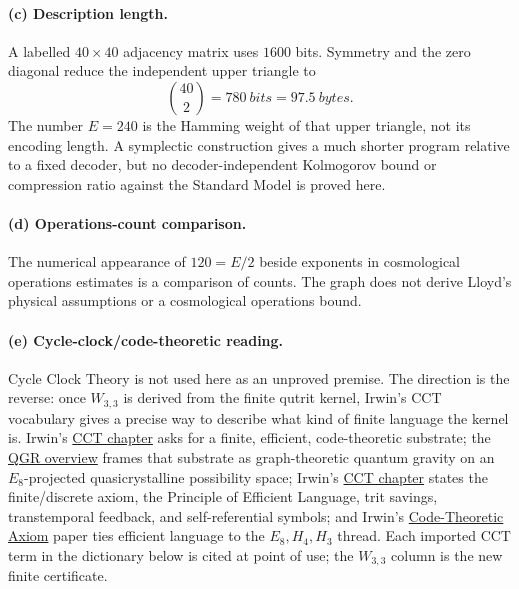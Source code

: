 \documentclass[12pt,a4paper]{article}
\def\text#1{#1}%
\theoremstyle{definition}
\begin{document}
\paragraph{(c) Description length.}
A labelled $40\times40$ adjacency matrix uses $1600$ bits.  Symmetry and
the zero diagonal reduce the independent upper triangle to
\[
 \binom{40}{2}=780\ \text{bits}=97.5\ \text{bytes}.
\]
The number $E=240$ is the Hamming weight of that upper triangle, not
its encoding length.  A symplectic construction gives a much shorter
program relative to a fixed decoder, but no decoder-independent
Kolmogorov bound or compression ratio against the Standard Model is
proved here.

\paragraph{(d) Operations-count comparison.}
The numerical appearance of $120=E/2$ beside exponents in cosmological
operations estimates is a comparison of counts.  The graph does not
derive Lloyd's physical assumptions or a cosmological operations bound.

\paragraph{(e) Cycle-clock/code-theoretic reading.}
Cycle Clock Theory is not used here as an unproved premise.  The
direction is the reverse: once $W_{3,3}$ is derived from the finite
qutrit kernel, Irwin's CCT vocabulary gives a precise way to describe
what kind of finite language the kernel is.  Irwin's
\href{https://www.altpropulsion.com/wp-content/uploads/2025/01/Klee-Irwin-Clock-Cycle-Theory-Jan2025.pdf}{CCT chapter}
asks for a finite, efficient, code-theoretic substrate; the
\href{https://quantumgravityresearch.org/cycle-clock-theory-overview/}{QGR overview}
frames that substrate as graph-theoretic quantum gravity on an
$E_8$-projected quasicrystalline possibility space; Irwin's
\href{https://www.altpropulsion.com/wp-content/uploads/2025/01/Klee-Irwin-Clock-Cycle-Theory-Jan2025.pdf}{CCT chapter}
states the finite/discrete axiom, the Principle of Efficient Language,
trit savings, transtemporal feedback, and self-referential symbols; and
Irwin's
\href{https://www.quantumgravityresearch.org/wp-content/uploads/2019/07/The-Code-Theoretic-Axiom-20190318.pdf}{Code-Theoretic Axiom}
paper ties efficient language to the
$E_8,H_4,H_3$ thread.  Each imported CCT term in the dictionary below is
cited at point of use; the $W_{3,3}$ column is the new finite certificate.
\end{document}
